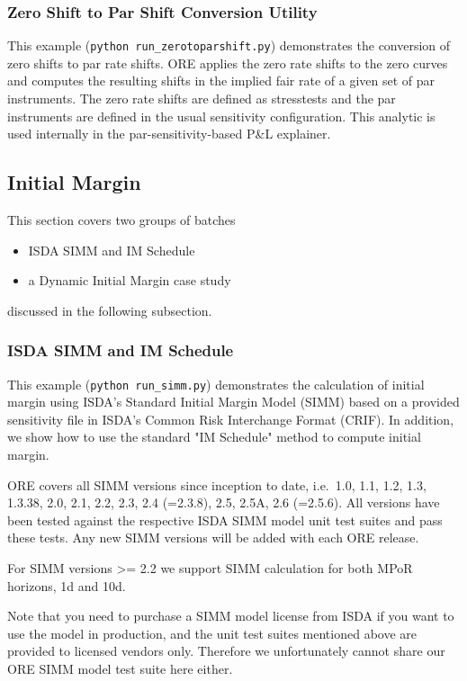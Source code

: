 \subsubsection{Zero Shift to Par Shift Conversion Utility}
\label{example:marketrisk_zerotoparshift}

This example ({\tt python run\_zerotoparshift.py}) demonstrates the conversion of zero shifts to par rate
shifts. ORE applies the zero rate shifts to the zero curves and computes the resulting shifts in the
implied fair rate of a given set of par instruments.  The zero rate shifts are defined as stresstests
and the par instruments are defined in the usual sensitivity configuration.
This analytic is used internally in the par-sensitivity-based P\&L explainer.
 
\subsection{Initial Margin}\label{example:initialmargin}

This section covers two groups of batches
\begin{itemize}
\item ISDA SIMM and IM Schedule
\item a Dynamic Initial Margin case study
\end{itemize}
discussed in the following subsection.

\subsubsection{ISDA SIMM and IM Schedule}

This example ({\tt python run\_simm.py}) demonstrates the calculation of initial margin using ISDA's Standard Initial Margin Model (SIMM) based on a provided 
sensitivity file in ISDA's Common Risk Interchange Format (CRIF). In addition, we show how to use the standard "IM Schedule" method to compute 
initial margin.

ORE covers all SIMM versions since inception to date, i.e.\ 1.0, 1.1, 1.2, 1.3, 1.3.38, 2.0, 2.1, 2.2, 2.3, 2.4 (=2.3.8), 2.5, 2.5A, 2.6 (=2.5.6).
All versions have been tested against the respective ISDA SIMM model unit test suites and pass these tests.
Any new SIMM versions will be added with each ORE release.

For SIMM versions >= 2.2 we support SIMM calculation for both MPoR horizons, 1d and 10d.
 
Note that you need to purchase a SIMM model license from ISDA if you want to use the model in production, and the unit test
suites mentioned above are provided to licensed vendors only. Therefore we unfortunately cannot share our ORE SIMM model 
test suite here either. 


